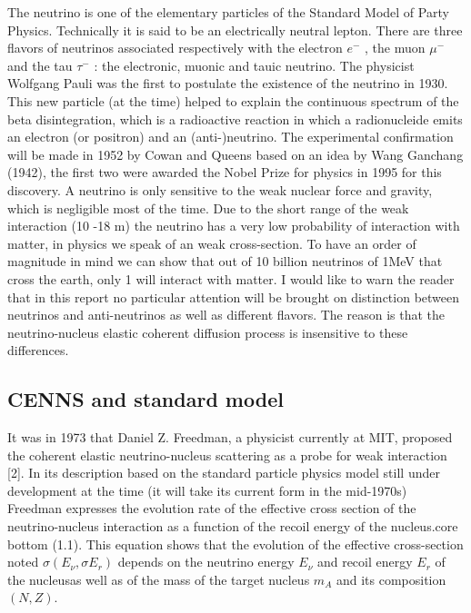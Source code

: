 The neutrino is one of the elementary particles of the Standard Model of Party Physics. Technically it is said to be an electrically neutral lepton. There are three flavors of neutrinos associated respectively with the electron $e^-$ , the muon $\mu^-$ and the tau $\tau^-$ : the electronic, muonic and tauic neutrino.
The physicist Wolfgang Pauli was the first to postulate the existence of the neutrino in 1930. This new particle (at the time) helped to explain the continuous spectrum of the beta disintegration, which is a radioactive reaction in which a radionucleide emits an electron (or positron) and an (anti-)neutrino.
The experimental confirmation will be made in 1952 by Cowan and Queens based on an idea by Wang Ganchang (1942), the first two were awarded the Nobel Prize for physics in 1995 for this discovery.
A neutrino is only sensitive to the weak nuclear force and gravity, which is negligible most of the time. Due to the short range of the weak interaction (10 -18 m) the neutrino has a very low probability of interaction with matter, in physics we speak of an weak cross-section. To have an order of magnitude in mind we can show that out of 10 billion neutrinos of 1MeV that cross the earth, only 1 will interact with matter. I would like to warn the reader that in this report no particular attention will be brought on distinction between neutrinos and anti-neutrinos as well as different flavors. The reason is that the neutrino-nucleus elastic coherent diffusion process is insensitive to these differences.


\subsection{CENNS and standard model}

It was in 1973 that Daniel Z. Freedman, a physicist currently at MIT, proposed the coherent elastic neutrino-nucleus scattering as a probe for weak interaction [2]. In its description based on the standard particle physics model still under development at the time (it will take its current form in the mid-1970s) Freedman expresses the evolution rate of the effective cross section of the neutrino-nucleus interaction as a function of the recoil energy of the nucleus.core bottom (1.1). This equation shows that the evolution of the effective cross-section noted $\sigma(E_{\nu} , \sigma{E_r} )$ depends on the neutrino energy $E_{\nu}$ and recoil energy $E_r$ of the nucleusas well as
of the mass of the target nucleus $m_A$ and its composition $(N ,Z)$.

